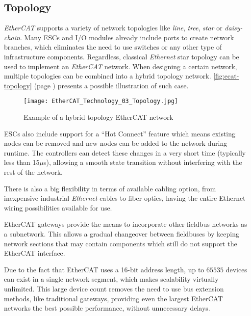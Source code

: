 \subsection{Topology} \label{subsec:ecat-topology}

\emph{EtherCAT} supports a variety of network topologies like \emph{line}, \emph{tree}, \emph{star} or \emph{daisy-chain}.
Many ESCs and I/O modules already include ports to create network branches, which eliminates the need to use switches or any other type of infrastructure components.
Regardless, classical \emph{Ethernet} star topology can be used to implement an \emph{EtherCAT} network.
When designing a certain network, multiple topologies can be combined into a hybrid topology network.
\autoref{fig:ecat-topology} (page \pageref{fig:ecat-topology}) presents a possible illustration of such case.

\begin{figure}[t]
	\centering
	\texttt{[image: EtherCAT\_Technology\_03\_Topology.jpg]}
	\caption{Example of a hybrid topology EtherCAT network \cite{protocol:ethercat}}
	\label{fig:ecat-topology}
\end{figure}

ESCs also include support for a ``Hot Connect'' feature which means existing nodes can be removed and new nodes can be added to the network during runtime.
The controllers can detect these changes in a very short time (typically less than 15$\mu$s), allowing a smooth state transition without interfering with the rest of the network.

There is also a big flexibility in terms of available cabling option, from inexpensive industrial \emph{Ethernet} cables to fiber optics, having the entire Ethernet wiring possibilities available for use.

EtherCAT gateways provide the means to incorporate other fieldbus networks as a subnetwork.
This allows a gradual changeover between fieldbuses by keeping network sections that may contain components which still do not support the EtherCAT interface.

Due to the fact that EtherCAT uses a 16-bit address length, up to $65535$ devices can exist in a single network segment, which makes scalability virtually unlimited.
This large device count removes the need to use bus extension methods, like traditional gateways, providing even the largest EtherCAT networks the best possible performance, without unnecessary delays.
